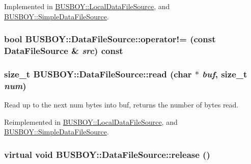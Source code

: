 Implemented in \hyperlink{classBUSBOY_1_1LocalDataFileSource_aa179b315828ee666797dfb91254ab1e1}{BUSBOY::LocalDataFileSource}, and \hyperlink{classBUSBOY_1_1SimpleDataFileSource_acd353a3343831533682d6f1dd6122573}{BUSBOY::SimpleDataFileSource}.\hypertarget{classBUSBOY_1_1DataFileSource_a1b9e815923b2d12c493aba58c7aacef7}{
\subsubsection[{operator!=}]{\setlength{\rightskip}{0pt plus 5cm}bool BUSBOY::DataFileSource::operator!= (const {\bf DataFileSource} \& {\em src}) const}}
\label{classBUSBOY_1_1DataFileSource_a1b9e815923b2d12c493aba58c7aacef7}
\hypertarget{classBUSBOY_1_1DataFileSource_a7466bffda1100fb6f330382b4e491dd6}{
\subsubsection[{read}]{\setlength{\rightskip}{0pt plus 5cm}size\_\-t BUSBOY::DataFileSource::read (char $\ast$ {\em buf}, \/  size\_\-t {\em num})}}
\label{classBUSBOY_1_1DataFileSource_a7466bffda1100fb6f330382b4e491dd6}


Read up to the next num bytes into buf, returns the number of bytes read. 

Reimplemented in \hyperlink{classBUSBOY_1_1LocalDataFileSource_af5b845f0dca80268e2d2d58fa101a38b}{BUSBOY::LocalDataFileSource}, and \hyperlink{classBUSBOY_1_1SimpleDataFileSource_ab3d357e13ac2707123f42e32184549d9}{BUSBOY::SimpleDataFileSource}.\hypertarget{classBUSBOY_1_1DataFileSource_a9f78f31eddcf41fd393e99ee00278d09}{
\subsubsection[{release}]{\setlength{\rightskip}{0pt plus 5cm}virtual void BUSBOY::DataFileSource::release ()}}
\label{classBUSBOY_1_1DataFileSource_a9f78f31eddcf41fd393e99ee00278d09}


